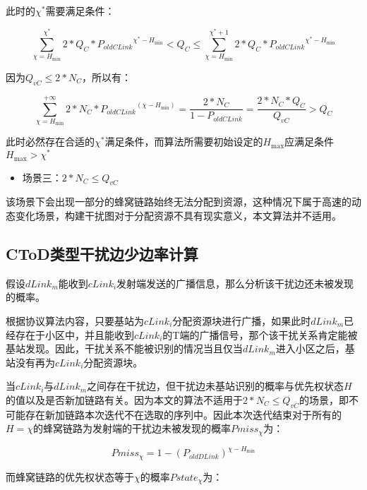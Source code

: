 \documentclass[figurelist,tablelist,algorithmlist,nomlist,masters]{seuthesix}
\begin{document}
	此时的$\chi ^*$需要满足条件：
	
	\begin{equation}\label{eq3.1}
	\sum\limits_{\chi = H_{\min }}^{\chi ^*} {2*Q_C*{P_{oldCLink}}^{\chi ^* - H_{\min }}} < Q_C \le \sum\limits_{\chi = H_{\min }}^{\chi ^* + 1} {2*Q_C*{P_{oldCLink}}^{\chi ^* - H_{\min }}}
	\end{equation}
	
	因为$Q_{vC} \le 2*N_C$，所以有：
	
	\begin{equation}\label{eq3.1}
	\sum\limits_{\chi = H_{\min }}^{ + \infty } {2*N_C*{P_{oldCLink}}^(\chi - H_{\min })}  = \frac{{2*N_C}}{{1 - {P_{oldCLink}}}} = \frac{{2*N_C*Q_C}}{{Q_{vC}}} > Q_C
	\end{equation}
	
	此时必然存在合适的$\chi ^*$满足条件，而算法所需要初始设定的$H_{\max }$应满足条件$H_{\max } > \chi ^*$
	
	\begin{itemize}
		\item 场景三：$2*N_C \le Q_{vC}$
	\end{itemize}
	
	该场景下会出现一部分的蜂窝链路始终无法分配到资源，这种情况下属于高速的动态变化场景，构建干扰图对于分配资源不具有现实意义，本文算法并不适用。
	
	
	\subsection{CToD类型干扰边少边率计算}
	假设$dLink_m$能收到$cLink_i$发射端发送的广播信息，那么分析该干扰边还未被发现的概率。
	
	根据协议算法内容，只要基站为$cLink_i$分配资源块进行广播，如果此时$dLink_m$已经存在于小区中，并且能收到$cLink_i$的T端的广播信号，那个该干扰关系肯定能被基站发现。因此，干扰关系不能被识别的情况当且仅当$dLink_m$进入小区之后，基站没有再为$cLink_i$分配资源块。
	
	当$cLink_i$与$dLink_m$之间存在干扰边，但干扰边未基站识别的概率与优先权状态$H$的值以及是否新加链路有关。因为本文的算法不适用于$2*N_C \le Q_{vC}$的场景，即不可能存在新加链路本次迭代不在选取的序列中。因此本次迭代结束对于所有的$H = \chi $的蜂窝链路为发射端的干扰边未被发现的概率$Pmiss_{\chi }$为：
	
	\begin{equation}\label{eq3.1}
	Pmiss_{\chi } = 1 - {({P_{oldDLink}})^{\chi - H_{\min }}}
	\end{equation}
	
	而蜂窝链路的优先权状态等于$\chi $的概率$Pstate_{\chi }$为：
	
\end{document}
